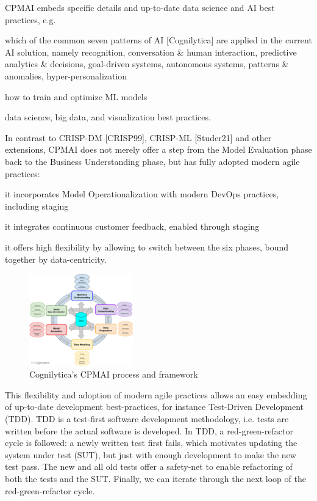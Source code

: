 \documentclass[twocolumn]{article}
\begin{document}
CPMAI embeds specific details and up-to-date data science and AI best practices, e.g.
\begin{compactitem}
\item which of the common seven patterns of AI [Cognilytica] are applied in the current AI solution, namely recognition, conversation \& human interaction, predictive analytics \& decisions, goal-driven systems, autonomous systems, patterns \& anomalies, hyper-personalization
\item how to train and optimize ML models
\item data science, big data, and visualization best practices.
\end{compactitem}

In contrast to CRISP-DM [CRISP99], CRISP-ML [Studer21] and other extensions, CPMAI does not merely offer a step from the Model Evaluation phase back to the Business Understanding phase, but has fully adopted modern agile practices: 
\begin{compactitem}
\item it incorporates Model Operationalization with modern DevOps practices, including staging
\item it integrates continuous customer feedback, enabled through staging
\item it offers high flexibility by allowing to switch between the six phases, bound together by data-centricity.
\end{compactitem}

\begin{figure}[hbt!]
  \begin{center}
  \vspace{-4mm}
\includegraphics[width=0.4\textwidth]{figures/cpmai}
  \vspace{-4mm}
\caption{Cognilytica’s CPMAI process and framework}
\label{fig:cpmai}
\end{center}
\end{figure}

This flexibility and adoption of modern agile practices allows an easy embedding of up-to-date development best-practices, for instance Test-Driven Development (TDD). TDD is a test-first software development methodology, i.e. tests are written before the actual software is developed. In TDD, a red-green-refactor cycle is followed: a newly written test first fails, which motivates updating the system under test (SUT), but just with enough development to make the new test pass. The new and all old tests offer a safety-net to enable refactoring of both the tests and the SUT. Finally, we can iterate through the next loop of the red-green-refactor cycle.
\end{document}
